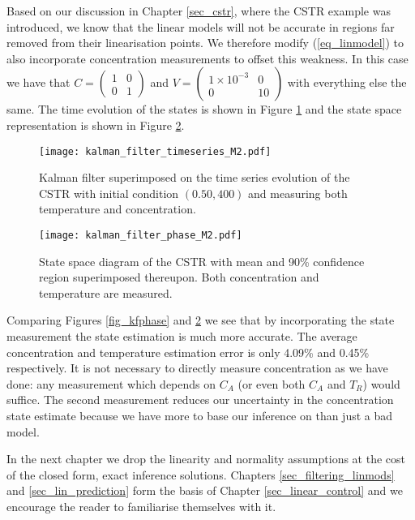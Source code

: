 Based on our discussion in Chapter \ref{sec_cstr}, where the CSTR example was introduced, we know that the linear models will not be accurate in regions far removed from their linearisation points. We therefore modify (\ref{eq_linmodel}) to also incorporate concentration measurements to offset this weakness. In this case we have that $C = \begin{pmatrix}
1 & 0\\0 &1
\end{pmatrix}$ and $V = \begin{pmatrix}
1\times 10^{-3} & 0\\0 & 10
\end{pmatrix}$ with everything else the same. The time evolution of the states is shown in Figure \ref{fig_kftime2} and the state space representation is shown in Figure \ref{fig_kfphase2}. 
\begin{figure}[H] 
\centering
\texttt{[image: kalman\_filter\_timeseries\_M2.pdf]}
\caption{Kalman filter superimposed on the time series evolution of the CSTR with initial condition $(0.50, 400)$ and measuring both temperature and concentration.}
\label{fig_kftime2}
\end{figure}
\begin{figure}[H] 
\centering
\texttt{[image: kalman\_filter\_phase\_M2.pdf]}
\caption{State space diagram of the CSTR with mean and 90\% confidence region superimposed thereupon. Both concentration and temperature are measured.}
\label{fig_kfphase2}
\end{figure}
Comparing Figures \ref{fig_kfphase} and \ref{fig_kfphase2} we see that by incorporating the state measurement the state estimation is much more accurate. The average concentration and temperature estimation error is only 4.09\% and 0.45\% respectively. It is not necessary to directly measure concentration as we have done: any measurement which depends on $C_A$ (or even both $C_A$ and $T_R$) would suffice. The second measurement reduces our uncertainty in the concentration state estimate because we have more to base our inference on than just a bad model.  

In the next chapter we drop the linearity and normality assumptions at the cost of the closed form, exact inference solutions. Chapters \ref{sec_filtering_linmods} and \ref{sec_lin_prediction} form the basis of Chapter \ref{sec_linear_control} and we encourage the reader to familiarise themselves with it. 
